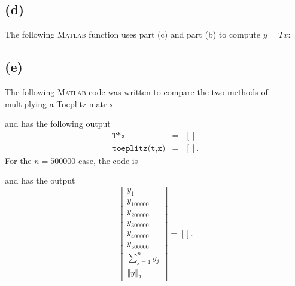 \documentclass[11pt]{article}
\newcommand{\MATLAB}{\textsc{Matlab}\xspace}
\theoremstyle{definition}
\theoremstyle{remark}
\newcommand{\newpart}{\vspace{-0.5\baselineskip}\hrulefill\vspace{-1.3\baselineskip}}
\theoremstyle{plain}
\begin{document}
\newpage
\newpart
\subsection*{(d)}
The following \MATLAB function uses part (c) and part (b) to compute $y=Tx$:


\newpart
\subsection*{(e)}
The following \MATLAB code was written to compare the two methods of multiplying a Toeplitz matrix

and has the following output
\begin{eqnarray*}
  \texttt{T*x}&=&\left[\right]\\
  \texttt{toeplitz(t,x)}&=&\left[\right].
\end{eqnarray*}
For the $n=500000$ case, the code is

and has the output
\begin{equation*}
  \left[\begin{array}{c}
          y_1\\
          y_{100000}\\
          y_{200000}\\
          y_{300000}\\
          y_{400000}\\
          y_{500000}\\
          \textstyle \sum_{j=1}^ny_j\\
          \left\Vert y\right\Vert_2
        \end{array}
      \right]=\left[\right].
\end{equation*}
\end{document}
